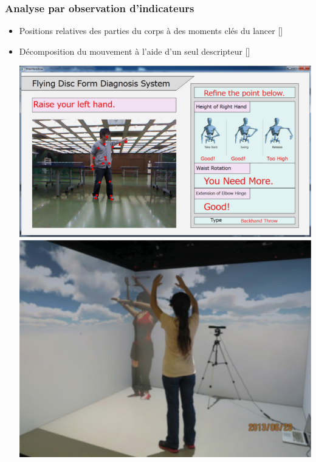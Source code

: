 \documentclass[svgnames]{beamer}
\newcommand{\mycite}[1]{[\textit{\cite{#1}}]}
\begin{document}
	\subsubsection{Analyse par observation d'indicateurs}
	\begin{frame}{\subsubsecname}
		\begin{itemize}[label=$\bullet$]
			\item Positions relatives des parties du corps à des moments clés du lancer \mycite{Yamaoka2013FoF}
			\item Décomposition du mouvement à l'aide d'un seul descripteur \mycite{Kyan2015ABD}
			
			\centering
				\includegraphics[scale=0.3]{img/flying_disc_TEL.png}
				\includegraphics[scale=0.3]{img/dance_cave_TEL.png}
		\end{itemize}
		
				
	\end{frame}
	
\end{document}
